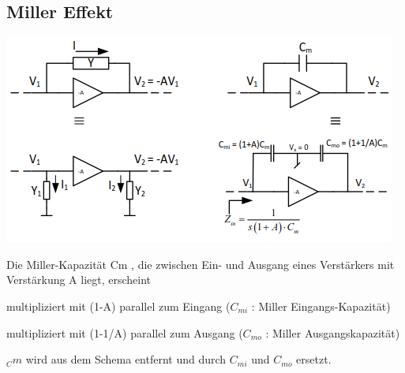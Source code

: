 \subsection{Miller Effekt}
\begin{minipage}[c]{0.5\textwidth}
	\includegraphics[width=1\linewidth]{chapters/Frequenzverhalten/images/miller}
\end{minipage}
\begin{minipage}[c]{0.5\textwidth}
	Die Miller-Kapazität Cm , die zwischen Ein- und Ausgang eines Verstärkers mit Verstärkung A liegt, erscheint
	\begin{compactitem}
		\item multipliziert mit (1-A) parallel zum Eingang ($C_{mi}$ : Miller Eingangs-Kapazität)
		\item multipliziert mit (1-1/A) parallel zum Ausgang ($C_{mo}$ : Miller Ausgangskapazität)
		\item $_Cm$ wird aus dem Schema entfernt und durch $C_{mi}$ und $C_{mo}$ ersetzt.
	\end{compactitem}
\end{minipage}
